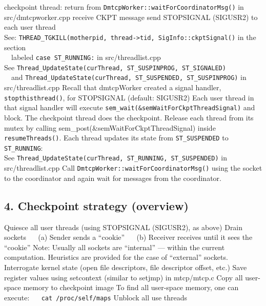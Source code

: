 \documentclass{article}
\begin{document}
\begin{algorithmic}[1]
\STATE checkpoint thread:
\STATE   return from {\tt DmtcpWorker::waitForCoordinatorMsg()}
	   in src/dmtcpworker.cpp
\STATE   receive CKPT message
\STATE   send STOPSIGNAL (SIGUSR2) to each user thread \\
  See:  {\tt THREAD\_TGKILL(motherpid, thread->tid, SigInfo::ckptSignal()}
                in the section \\
                ~~labeled {\tt case~ST\_RUNNING:} in src/threadlist.cpp \\
  See {\tt Thread\_UpdateState(curThread, ST\_SUSPINPROG, ST\_SIGNALED)} \\
  ~~and {\tt Thread\_UpdateState(curThread, ST\_SUSPENDED, ST\_SUSPINPROG)}
	in src/threadlist.cpp
\STATE   Recall that dmtcpWorker created a signal handler,
            {\tt stopthisthread()}, for STOPSIGNAL (default: SIGUSR2)
\STATE   Each user thread in that signal handler will
           execute {\tt sem\_wait(\&semWaitForCkptThreadSignal)} and block.
\STATE   The checkpoint thread does the checkpoint.
\newline
\STATE   Release each thread from its mutex
           by calling {sem\_post(\&semWaitForCkptThreadSignal)}
           inside {\tt resumeThreads()}.
\STATE  Each thread updates its state from {\tt ST\_SUSPENDED}
           to {\tt ST\_RUNNING}: \\
       See {\tt Thread\_UpdateState(curThread, ST\_RUNNING, ST\_SUSPENDED)}
	in src/threadlist.cpp
\STATE  Call {\tt DmtcpWorker::waitForCoordinatorMsg()} using the socket
          to the coordinator and again wait for
	  messages from the coordinator.
\end{algorithmic}

\subsection*{4. Checkpoint strategy (overview)}

\begin{algorithmic}[1]
\STATE Quiesce all user threads (using STOPSIGNAL (SIGUSR2), as above)
\STATE Drain sockets \newline
  \hbox{\ \ } (a) Sender sends a ``cookie'' \newline
  \hbox{\ \ } (b) Receiver receives until it sees the ``cookie'' \newline
  Note:  Usually all sockets are ``internal'' --- within the current
    computation.  Heuristics are provided for the case of ``external'' sockets.
\STATE Interrogate kernel state (open file descriptors, file descriptor offset, etc.)
\STATE Save register values using setcontext (similar to setjmp) in mtcp/mtcp.c
\STATE Copy all user-space memory to checkpoint image
  To find all user-space memory, one can execute: \newline
  \hbox{\ \ } {\tt cat /proc/self/maps}
\STATE Unblock all use threads
\end{algorithmic}
\end{document}
